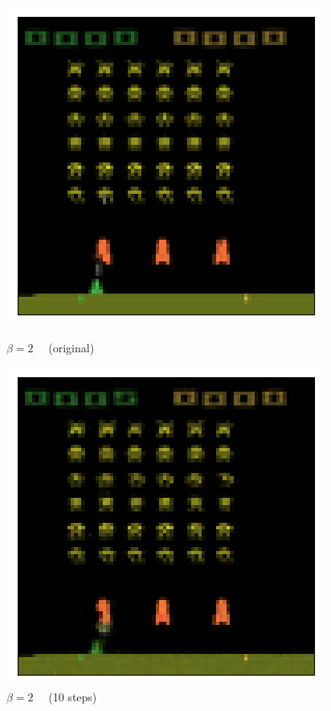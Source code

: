 \begin{figure}[h!]
\begin{multicols}{4}
    \includegraphics[scale=0.4]{figures/results/colour_separated/beta_2_posterior_sample_original.png}
    \caption{$\beta=2\quad$ (original)}
    \includegraphics[scale=0.4]{figures/results/colour_separated/beta_2_posterior_sample_10.png}
    \caption{$\beta=2\quad$ (10 steps)}

\end{multicols}
\end{figure}
